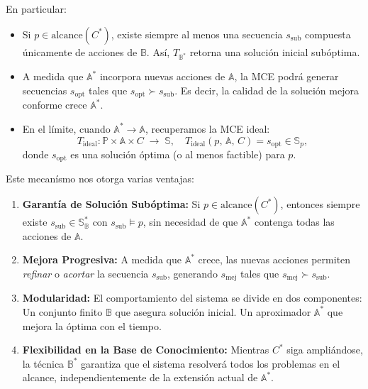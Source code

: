 En particular:

\begin{itemize}
    \item Si \(p \in \mathrm{alcance}(C^*)\), existe siempre al menos una secuencia \(s_{\text{sub}}\) compuesta únicamente de acciones de \(\mathbb{B}\). Así, \(T_{\mathbb{B}^*}\) retorna una solución inicial subóptima.
    \item A medida que \(\mathbb{A}^*\) incorpora nuevas acciones de \(\mathbb{A}\), la MCE podrá generar secuencias \(s_{\text{opt}}\) tales que \(s_{\text{opt}}\succ s_{\text{sub}}\). Es decir, la calidad de la solución mejora conforme crece \(\mathbb{A}^*\).

    \item En el límite, cuando \(\mathbb{A}^* \to \mathbb{A}\), recuperamos la MCE ideal:
    \leavevmode
    \begin{equation}
    T_{\text{ideal}} : \mathbb{P} \times \mathbb{A} \times C \;\longrightarrow\; \mathbb{S},
    \quad
    T_{\text{ideal}}(p,\,\mathbb{A},\,C) = s_{\mathrm{opt}} \in \mathbb{S}_p,
    \end{equation}
    donde \(s_{\mathrm{opt}}\) es una solución óptima (o al menos factible) para \(p\).

\end{itemize}

Este mecanísmo nos otorga varias ventajas:

\begin{enumerate}
    \item \textbf{Garantía de Solución Subóptima:}  
    Si \(p \in \mathrm{alcance}(C^*)\), entonces siempre existe \(s_{\text{sub}} \in \mathbb{S}_{\mathbb{B}}^*\) con \(s_{\text{sub}} \models p\), sin necesidad de que \(\mathbb{A}^*\) contenga todas las acciones de \(\mathbb{A}\).
    \item \textbf{Mejora Progresiva:}  
    A medida que \(\mathbb{A}^*\) crece, las nuevas acciones permiten \emph{refinar} o \emph{acortar} la secuencia \(s_{\text{sub}}\), generando \(s_{\text{mej}}\) tales que \(s_{\text{mej}}\succ s_{\text{sub}}\).
    \item \textbf{Modularidad:}  
    El comportamiento del sistema se divide en dos componentes:  
        \subitem Un conjunto finito \(\mathbb{B}\) que asegura solución inicial.  
        \subitem Un aproximador \(\mathbb{A}^*\) que mejora la óptima con el tiempo.  
    \item \textbf{Flexibilidad en la Base de Conocimiento:}  
    Mientras \(C^*\) siga ampliándose, la técnica \(\mathbb{B}^*\) garantiza que el sistema resolverá todos los problemas en el alcance, independientemente de la extensión actual de \(\mathbb{A}^*\).
\end{enumerate}

